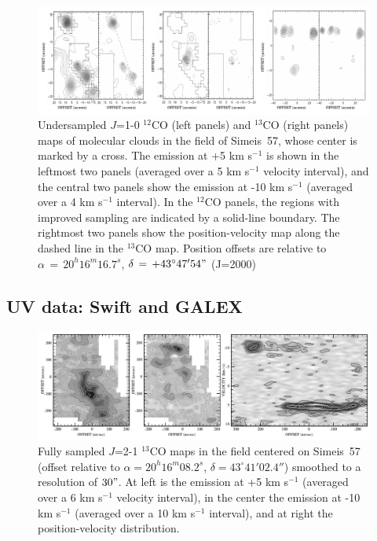 \documentclass{aa}
\begin{document}

\begin{figure}
\includegraphics[width=1\textwidth]{BLT_CO.pdf}
\caption{Undersampled $J$=1-0 $^{12}$CO (left panels) and $^{13}$CO
  (right panels) maps of molecular clouds in the field of Simeis~57,
  whose center is marked by a cross. The emission at +5 km s$^{-1}$ is
  shown in the leftmost two panels (averaged over a 5 km s$^{-1}$
  velocity interval), and the central two panels show the emission at
  -10 km s$^{-1}$ (averaged over a 4 km s$^{-1}$ interval). In the
  $^{12}$CO panels, the regions with improved sampling are indicated
  by a solid-line boundary.  The rightmost two panels show the
  position-velocity map along the dashed line in the $^{13}$CO
  map. Position offsets are relative to $\alpha\,=\,20^h16^m16.7^s$,
  $\delta\,=\,+43^{\circ}47'54"$ (J=2000)}
\label{fig:blt_co_maps}
\end{figure}

\subsection{UV data: Swift and GALEX}


\begin{figure}
\includegraphics[width=1\textwidth]{COred_COblue_PV.pdf}
\centering
\caption{Fully sampled $J$=2-1 $^{13}$CO maps in the field centered on
  Simeis~57 (offset relative to $\alpha=20^h16^m08.2^s$,
  $\delta=43^{\circ}41'02.4''$) smoothed to a resolution of $30"$. At
  left is the emission at +5 km s$^{-1}$ (averaged over a 6 km
  s$^{-1}$ velocity interval), in the center the emission at -10 km
  s$^{-1}$ (averaged over a 10 km s$^{-1}$ interval), and at right the
  position-velocity distribution.}
\label{fig:jcmt_co_maps}
\end{figure}
\end{document}
